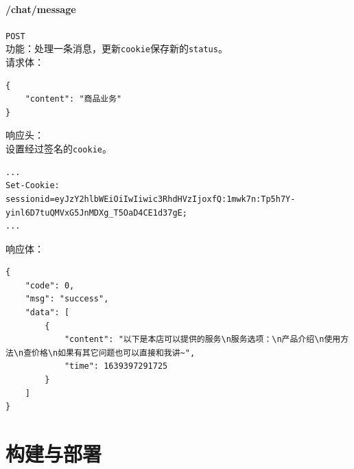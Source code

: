 \documentclass[hyperref]{ctexart}
\begin{document}
\paragraph{/chat/message} \texttt{POST}\\
功能：处理一条消息，更新\texttt{cookie}保存新的\texttt{status}。\\
请求体：
\begin{lstlisting}
{
    "content": "商品业务"
}
\end{lstlisting}
响应头：\\
设置经过签名的\texttt{cookie}。
\begin{lstlisting}
...
Set-Cookie: sessionid=eyJzY2hlbWEiOiIwIiwic3RhdHVzIjoxfQ:1mwk7n:Tp5h7Y-yinl6D7tuQMVxG5JnMDXg_T5OaD4CE1d37gE;
...
\end{lstlisting}
响应体：
\begin{lstlisting}
{
    "code": 0,
    "msg": "success",
    "data": [
        {
            "content": "以下是本店可以提供的服务\n服务选项：\n产品介绍\n使用方法\n查价格\n如果有其它问题也可以直接和我讲~",
            "time": 1639397291725
        }
    ]
}
\end{lstlisting}
\section{构建与部署}
\end{document}
